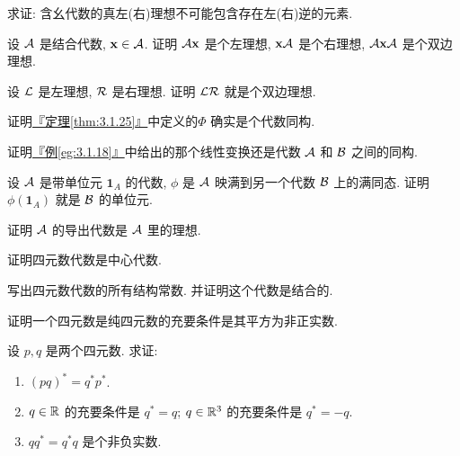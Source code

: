 \documentclass[lang=cn,zihao=-4,twoside,fontset=none]{textbook}
\newcommand{\thmref}[1]{\hyperref[#1]{『定理\textnormal{\ref*{#1}}』}}
\newcommand{\egref}[1]{\hyperref[#1]{『例\textnormal{\ref*{#1}}』}}
\newcommand{\nalph}{\textnormal{(\alph*)}}
\newcommand{\bfid}{\mathbf{1}}
\begin{document}
\begin{problem}
    \label{ex:3.8}%
    求证: 含幺代数的真左(右)理想不可能包含存在左(右)逆的元素.
\end{problem}

\begin{problem}
    \label{ex:3.9}%
    设 ${\mathcal A}$ 是结合代数, ${\mathbf x}\in{\mathcal A}$. 证明 ${\mathcal A}{\mathbf x}$ 是个左理想, ${\mathbf x}{\mathcal A}$ 是个右理想, ${\mathcal A}{\mathbf x}{\mathcal A}$ 是个双边理想.
\end{problem}

\begin{problem}
    \label{ex:3.10}%
    设 ${\mathcal L}$ 是左理想, ${\mathcal R}$ 是右理想. 证明 ${\mathcal L}{\mathcal R}$ 就是个双边理想.
\end{problem}

\begin{problem}
    \label{ex:3.11}%
    证明\thmref{thm:3.1.25}中定义的$\varPhi$ 确实是个代数同构.
\end{problem}

\begin{problem}
    \label{ex:3.12}%
    证明\egref{eg:3.1.18}中给出的那个线性变换还是代数 ${\mathcal A}$ 和 ${\mathcal B}$ 之间的同构.
\end{problem}

\begin{problem}
    \label{ex:3.13}%
    设 ${\mathcal A}$ 是带单位元 $\bfid_A$ 的代数, $\phi$ 是 ${\mathcal A}$ 映满到另一个代数 ${\mathcal B}$ 上的满同态. 证明 $\phi(\bfid_A)$ 就是 ${\mathcal B}$ 的单位元. 
\end{problem}

\begin{problem}
    \label{ex:3.14}%
    证明 ${\mathcal A}$ 的导出代数是 ${\mathcal A}$ 里的理想.
\end{problem}

\begin{problem}
    \label{ex:3.15}%
    证明四元数代数是中心代数.
\end{problem}

\begin{problem}
    \label{ex:3.16}%
    写出四元数代数的所有结构常数. 并证明这个代数是结合的.
\end{problem}

\begin{problem}
    \label{ex:3.17}%
    证明一个四元数是纯四元数的充要条件是其平方为非正实数.
\end{problem}

\begin{problem}
    \label{ex:3.18}%
    设 $p,q$ 是两个四元数. 求证:
    \begin{enumerate}[label=\nalph]
        \item $(pq)^*=q^*p^*$.
        \item $q\in{\mathbb R}$ 的充要条件是 $q^*=q$; $q\in{\mathbb R}^3$ 的充要条件是 $q^*=-q$.
        \item $qq^*=q^*q$ 是个非负实数.
    \end{enumerate}
\end{problem}
\end{document}
